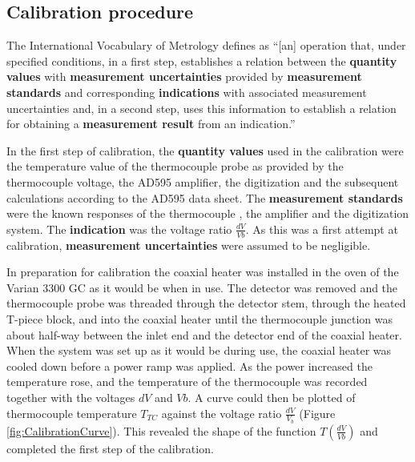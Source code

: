 \subsection{Calibration procedure}
\label{sec:Calibration}

The International Vocabulary of Metrology \autocite{JCGM200:2012} defines
 as ``[an] operation that, under specified conditions, in a
first step, establishes a relation between the \textbf{quantity values} with
\textbf{measurement uncertainties} provided by \textbf{measurement standards}
and corresponding \textbf{indications} with associated measurement uncertainties
and, in a second step, uses this information to establish a relation for
obtaining a \textbf{measurement result} from an indication.''

In the first step of calibration, the \textbf{quantity values} used in the
calibration were the temperature value of the thermocouple probe as provided by
the thermocouple voltage, the AD595 amplifier, the digitization and the
subsequent calculations according to the AD595 data sheet. The
\textbf{measurement standards} were the known responses of the thermocouple
\autocite{Ripple1995}, the amplifier and the digitization system. The
\textbf{indication} was the voltage ratio \(\frac{dV}{Vb}\). As this was a first
attempt at calibration, \textbf{measurement uncertainties} were assumed to be
negligible.

In preparation for calibration the coaxial heater was installed in the oven of
the Varian 3300 GC as it would be when in use. The detector was removed and the
thermocouple probe was threaded through the detector stem, through the heated
T-piece block, and into the coaxial heater until the thermocouple junction was
about half-way between the inlet end and the detector end of the coaxial heater.
When the system was set up as it would be during use, the coaxial heater was
cooled down before a power ramp was applied. As the power increased the
temperature rose, and the temperature of the thermocouple was recorded together
with the voltages \(dV\) and \(Vb\). A curve could then be plotted of
thermocouple temperature \(T_{TC}\) against the voltage ratio \( \frac{dV}{V_b}
\) (Figure \ref{fig:CalibrationCurve}). This revealed the shape of the function
\(T(\frac{dV}{Vb})\) and completed the first step of the calibration.

